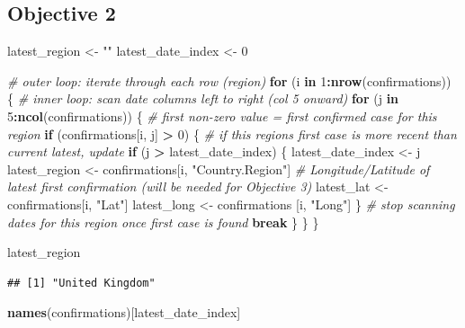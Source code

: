 \documentclass[
]{article}
\newenvironment{Shaded}{\begin{snugshade}}{\end{snugshade}}
\newcommand{\CommentTok}[1]{\textcolor[rgb]{0.56,0.35,0.01}{\textit{#1}}}
\newcommand{\ControlFlowTok}[1]{\textcolor[rgb]{0.13,0.29,0.53}{\textbf{#1}}}
\newcommand{\DecValTok}[1]{\textcolor[rgb]{0.00,0.00,0.81}{#1}}
\newcommand{\FunctionTok}[1]{\textcolor[rgb]{0.13,0.29,0.53}{\textbf{#1}}}
\newcommand{\NormalTok}[1]{#1}
\newcommand{\OtherTok}[1]{\textcolor[rgb]{0.56,0.35,0.01}{#1}}
\newcommand{\SpecialCharTok}[1]{\textcolor[rgb]{0.81,0.36,0.00}{\textbf{#1}}}
\newcommand{\StringTok}[1]{\textcolor[rgb]{0.31,0.60,0.02}{#1}}
\begin{document}
\subsection{Objective 2}\label{objective-2}

\begin{Shaded}
\begin{Highlighting}[]
\NormalTok{latest\_region }\OtherTok{\textless{}{-}} \StringTok{""}
\NormalTok{latest\_date\_index }\OtherTok{\textless{}{-}} \DecValTok{0}

\CommentTok{\# outer loop: iterate through each row (region)}
\ControlFlowTok{for}\NormalTok{ (i }\ControlFlowTok{in} \DecValTok{1}\SpecialCharTok{:}\FunctionTok{nrow}\NormalTok{(confirmations)) \{}
  \CommentTok{\# inner loop: scan date columns left to right (col 5 onward)}
  \ControlFlowTok{for}\NormalTok{ (j }\ControlFlowTok{in} \DecValTok{5}\SpecialCharTok{:}\FunctionTok{ncol}\NormalTok{(confirmations)) \{}
    \CommentTok{\# first non{-}zero value = first confirmed case for this region}
    \ControlFlowTok{if}\NormalTok{ (confirmations[i, j] }\SpecialCharTok{\textgreater{}} \DecValTok{0}\NormalTok{) \{}
      \CommentTok{\# if this region\textquotesingle{}s first case is more recent than current latest, update}
      \ControlFlowTok{if}\NormalTok{ (j }\SpecialCharTok{\textgreater{}}\NormalTok{ latest\_date\_index) \{}
\NormalTok{        latest\_date\_index }\OtherTok{\textless{}{-}}\NormalTok{ j}
\NormalTok{        latest\_region }\OtherTok{\textless{}{-}}\NormalTok{ confirmations[i, }\StringTok{"Country.Region"}\NormalTok{]}
        \CommentTok{\# Longitude/Latitude of latest first confirmation (will be needed for Objective 3)}
\NormalTok{        latest\_lat }\OtherTok{\textless{}{-}}\NormalTok{ confirmations[i, }\StringTok{"Lat"}\NormalTok{]}
\NormalTok{        latest\_long }\OtherTok{\textless{}{-}}\NormalTok{ confirmations [i, }\StringTok{"Long"}\NormalTok{]}
\NormalTok{      \}}
      \CommentTok{\# stop scanning dates for this region once first case is found}
      \ControlFlowTok{break}
\NormalTok{    \}}
\NormalTok{  \}}
\NormalTok{\}}

\NormalTok{latest\_region}
\end{Highlighting}
\end{Shaded}

\begin{verbatim}
## [1] "United Kingdom"
\end{verbatim}

\begin{Shaded}
\begin{Highlighting}[]
\FunctionTok{names}\NormalTok{(confirmations)[latest\_date\_index]}
\end{Highlighting}
\end{Shaded}
\end{document}
